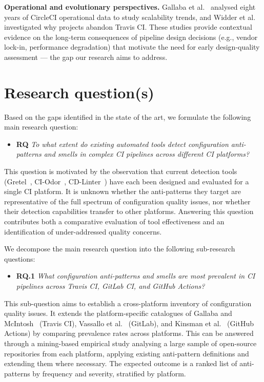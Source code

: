 \documentclass[a4paper,11pt,oneside]{article}
\begin{document}
\textbf{Operational and evolutionary perspectives.} Gallaba et al.~\cite{Gallaba2022} analysed eight years of CircleCI operational data to study scalability trends, and Widder et al.~\cite{Widder2018} investigated why projects abandon Travis CI. These studies provide contextual evidence on the long-term consequences of pipeline design decisions (e.g., vendor lock-in, performance degradation) that motivate the need for early design-quality assessment --- the gap our research aims to address.


\section{Research question(s)}

Based on the gaps identified in the state of the art, we formulate the following main research question:

\begin{itemize}
    \item \textbf{RQ} \emph{To what extent do existing automated tools detect configuration anti-patterns and smells in complex CI pipelines across different CI platforms?}
\end{itemize}

This question is motivated by the observation that current detection tools (Gretel~\cite{Gallaba2020}, CI-Odor~\cite{Vassallo2019}, CD-Linter~\cite{Vassallo2020}) have each been designed and evaluated for a single CI platform. It is unknown whether the anti-patterns they target are representative of the full spectrum of configuration quality issues, nor whether their detection capabilities transfer to other platforms. Answering this question contributes both a comparative evaluation of tool effectiveness and an identification of under-addressed quality concerns.


\pagebreak

We decompose the main research question into the following sub-research questions:

\begin{itemize}
    \item \textbf{RQ.1} \emph{What configuration anti-patterns and smells are most prevalent in CI pipelines across Travis CI, GitLab CI, and GitHub Actions?}
\end{itemize}

This sub-question aims to establish a cross-platform inventory of configuration quality issues. It extends the platform-specific catalogues of Gallaba and McIntosh~\cite{Gallaba2020} (Travis CI), Vassallo et al.~\cite{Vassallo2020} (GitLab), and Kinsman et al.~\cite{Kinsman2021} (GitHub Actions) by comparing prevalence rates across platforms. This can be answered through a mining-based empirical study analysing a large sample of open-source repositories from each platform, applying existing anti-pattern definitions and extending them where necessary. The expected outcome is a ranked list of anti-patterns by frequency and severity, stratified by platform.
\end{document}

